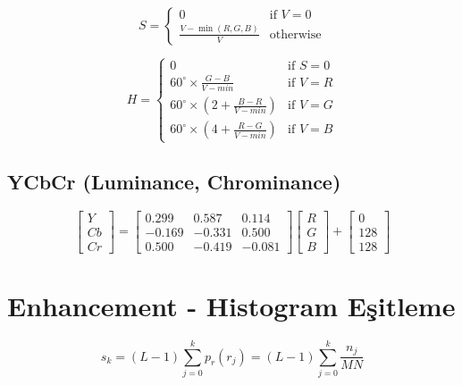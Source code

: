 \documentclass[12pt,a4paper]{article}
\begin{document}
\begin{equation}
S = \begin{cases} 
0 & \text{if } V = 0 \\ 
\frac{V - \min(R,G,B)}{V} & \text{otherwise} 
\end{cases}
\end{equation}

\begin{equation}
H = \begin{cases} 
0 & \text{if } S = 0 \\
60^{\circ} \times \frac{G-B}{V-min} & \text{if } V = R \\
60^{\circ} \times \left(2 + \frac{B-R}{V-min}\right) & \text{if } V = G \\
60^{\circ} \times \left(4 + \frac{R-G}{V-min}\right) & \text{if } V = B
\end{cases}
\end{equation}

\subsection{YCbCr (Luminance, Chrominance)}
\begin{equation}
\begin{bmatrix} Y \\ Cb \\ Cr \end{bmatrix} = 
\begin{bmatrix} 0.299 & 0.587 & 0.114 \\ -0.169 & -0.331 & 0.500 \\ 0.500 & -0.419 & -0.081 \end{bmatrix}
\begin{bmatrix} R \\ G \\ B \end{bmatrix} +
\begin{bmatrix} 0 \\ 128 \\ 128 \end{bmatrix}
\end{equation}

\section{Enhancement - Histogram Eşitleme}

\begin{equation}
s_k = (L-1) \sum_{j=0}^{k} p_r(r_j) = (L-1) \sum_{j=0}^{k} \frac{n_j}{MN}
\end{equation}
\end{document}
